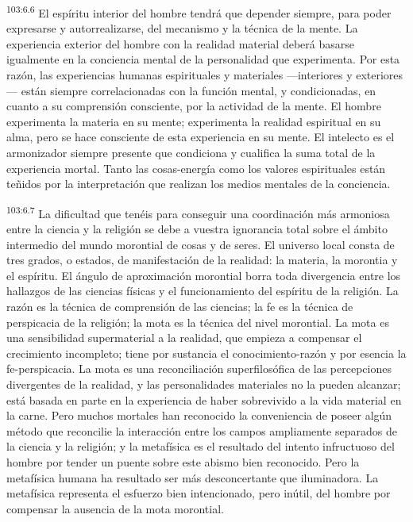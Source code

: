 \documentclass[twoside, 11pt]{book}
\begin{document}
\par
\textsuperscript{103:6.6} El espíritu interior del hombre tendrá que depender siempre, para poder expresarse y autorrealizarse, del mecanismo y la técnica de la mente. La experiencia exterior del hombre con la realidad material deberá basarse igualmente en la conciencia mental de la personalidad que experimenta. Por esta razón, las experiencias humanas espirituales y materiales ---interiores y exteriores--- están siempre correlacionadas con la función mental, y condicionadas, en cuanto a su comprensión consciente, por la actividad de la mente. El hombre experimenta la materia en su mente; experimenta la realidad espiritual en su alma, pero se hace consciente de esta experiencia en su mente. El intelecto es el armonizador siempre presente que condiciona y cualifica la suma total de la experiencia mortal. Tanto las cosas-energía como los valores espirituales están teñidos por la interpretación que realizan los medios mentales de la conciencia.

\par
\textsuperscript{103:6.7} La dificultad que tenéis para conseguir una coordinación más armoniosa entre la ciencia y la religión se debe a vuestra ignorancia total sobre el ámbito intermedio del mundo morontial de cosas y de seres. El universo local consta de tres grados, o estados, de manifestación de la realidad: la materia, la morontia y el espíritu. El ángulo de aproximación morontial borra toda divergencia entre los hallazgos de las ciencias físicas y el funcionamiento del espíritu de la religión. La razón es la técnica de comprensión de las ciencias; la fe es la técnica de perspicacia de la religión; la mota es la técnica del nivel morontial. La mota es una sensibilidad supermaterial a la realidad, que empieza a compensar el crecimiento incompleto; tiene por sustancia el conocimiento-razón y por esencia la fe-perspicacia. La mota es una reconciliación superfilosófica de las percepciones divergentes de la realidad, y las personalidades materiales no la pueden alcanzar; está basada en parte en la experiencia de haber sobrevivido a la vida material en la carne. Pero muchos mortales han reconocido la conveniencia de poseer algún método que reconcilie la interacción entre los campos ampliamente separados de la ciencia y la religión; y la metafísica es el resultado del intento infructuoso del hombre por tender un puente sobre este abismo bien reconocido. Pero la metafísica humana ha resultado ser más desconcertante que iluminadora. La metafísica representa el esfuerzo bien intencionado, pero inútil, del hombre por compensar la ausencia de la mota morontial.
\end{document}
